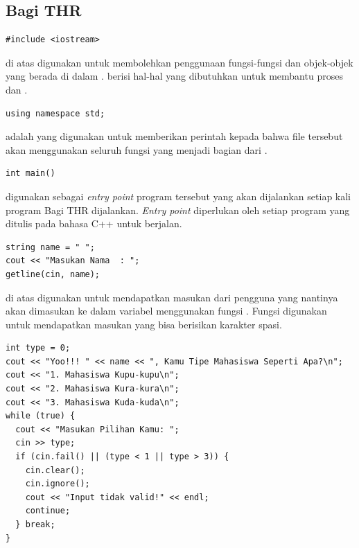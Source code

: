 \documentclass[../main.tex]{subfiles}
\begin{document}
    \subsection{Bagi THR}

\begin{code}
\begin{verbatim}
#include <iostream>
\end{verbatim}
\end{code}

    {\Script} di atas digunakan untuk membolehkan penggunaan fungsi-fungsi dan objek-objek yang berada di dalam {\header} {\file} . {\Header} {\file}  berisi hal-hal yang dibutuhkan untuk membantu proses {\ioi} dan {\ioo}.

\begin{code}
\begin{verbatim}
using namespace std;
\end{verbatim}
\end{code}

    {\Script}  adalah {\statement} yang digunakan untuk memberikan perintah kepada {\compiler} bahwa file tersebut akan menggunakan seluruh fungsi yang menjadi bagian dari .

\begin{code}
\begin{verbatim}
int main() 
\end{verbatim}
\end{code}

    {\Script} digunakan sebagai \textit{entry point} program tersebut yang akan dijalankan setiap kali program Bagi THR dijalankan. \textit{Entry point} diperlukan oleh setiap program yang ditulis pada bahasa C++ untuk berjalan.

\begin{code}
\begin{verbatim}
string name = " ";
cout << "Masukan Nama  : ";
getline(cin, name);
\end{verbatim}
\end{code}

    {\Script} di atas digunakan untuk mendapatkan masukan dari pengguna yang nantinya akan dimasukan ke dalam variabel  menggunakan fungsi . Fungsi  digunakan untuk mendapatkan masukan yang bisa berisikan karakter spasi.

\begin{code}
\begin{verbatim}
int type = 0;
cout << "Yoo!!! " << name << ", Kamu Tipe Mahasiswa Seperti Apa?\n";
cout << "1. Mahasiswa Kupu-kupu\n";
cout << "2. Mahasiswa Kura-kura\n";
cout << "3. Mahasiswa Kuda-kuda\n";
while (true) {
  cout << "Masukan Pilihan Kamu: ";
  cin >> type;
  if (cin.fail() || (type < 1 || type > 3)) {
    cin.clear();
    cin.ignore();
    cout << "Input tidak valid!" << endl;
    continue;
  } break;
}
\end{verbatim}
\end{code}
\end{document}
